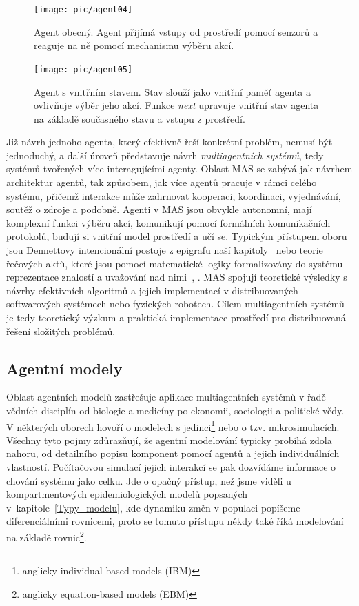 \begin{figure}%
\centerline{%
\texttt{[image: pic/agent04]}%
}
\caption{Agent obecný. Agent přijímá vstupy od prostředí pomocí senzorů a reaguje na ně pomocí mechanismu výběru akcí.}%
\label{fig:agent}%
\end{figure}

\begin{figure}%
\centerline{%
\texttt{[image: pic/agent05]}%
}
\caption{Agent s vnitřním stavem. Stav slouží jako vnitřní paměť agenta a ovlivňuje výběr jeho akcí. Funkce \emph{next} upravuje vnitřní stav agenta na základě současného stavu a vstupu z prostředí.}%
\label{fig:agent-stav}%
\end{figure}

Již návrh jednoho agenta, který efektivně řeší konkrétní problém, nemusí být jednoduchý, a další úroveň představuje návrh \emph{multiagentních systémů}, tedy systémů tvořených více interagujícími agenty.  
Oblast MAS se zabývá jak návrhem architektur agentů, tak způsobem, jak více agentů pracuje v rámci celého systému, přičemž interakce může zahrnovat kooperaci, koordinaci, vyjednávání, soutěž o zdroje a podobně. Agenti v MAS jsou obvykle autonomní, mají komplexní funkci výběru akcí, komunikují pomocí formálních komunikačních protokolů, budují si vnitřní model prostředí a učí se. Typickým přístupem oboru jsou Dennettovy intencionální postoje z epigrafu naší kapitoly~\cite{Dennett87} nebo teorie řečových aktů, které jsou pomocí matematické logiky formalizovány do systému reprezentace znalostí a uvažování nad nimi~\cite{Shoham93}, \cite{Cohen96}. MAS spojují teoretické výsledky s návrhy efektivních algoritmů a jejich implementací v distribuovaných softwarových systémech nebo fyzických robotech. Cílem multiagentních systémů je tedy teoretický výzkum a praktická implementace prostředí pro distribuovaná řešení složitých problémů.  

\subsection*{Agentní modely}

Oblast agentních modelů zastřešuje aplikace multiagentních systémů v řadě vědních disciplín od biologie a medicíny po ekonomii, sociologii a politické vědy. V některých oborech hovoří o modelech s jedinci\footnote{anglicky individual-based models (IBM)} nebo o tzv. mikrosimulacích. 
Všechny tyto pojmy zdůrazňují, že agentní modelování typicky probíhá zdola nahoru, od detailního popisu komponent pomocí agentů a jejich individuálních vlastností. Počítačovou simulací jejich interakcí se pak dozvídáme informace o chování systému jako celku. Jde o opačný přístup, než jsme viděli u kompartmentových epidemiologických modelů popsaných v~kapitole~\ref{Typy_modelu}, kde dynamiku změn v populaci popíšeme diferenciálními rovnicemi, proto se tomuto přístupu někdy také říká modelování na základě rovnic\footnote{anglicky equation-based models (EBM)}. 

